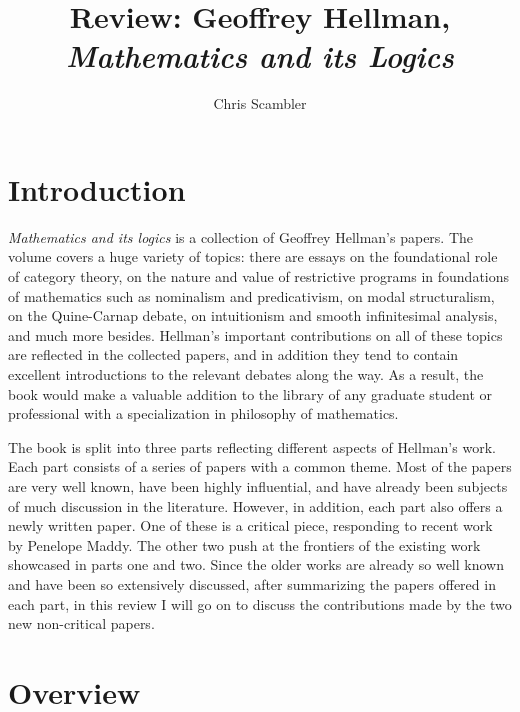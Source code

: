 \documentclass{amsart}
\title{Review: Geoffrey Hellman, \emph{Mathematics and its Logics}}
\author{Chris Scambler}
\theoremstyle{definition}
\begin{document}
 
\maketitle

\section{Introduction}

\emph{Mathematics and its logics} is a collection of Geoffrey Hellman's papers. 
The volume covers a huge variety of topics:
there are essays on the foundational role of category theory, 
on the nature and value of restrictive programs in foundations of mathematics such as 
nominalism and predicativism, 
on modal structuralism, on the Quine-Carnap debate, 
on intuitionism and smooth infinitesimal analysis, 
and much more besides. 
Hellman's important contributions on all of these topics are reflected in the collected papers, 
and in addition they tend to contain excellent introductions to the relevant debates along the way.
As a result, 
the book would make a valuable addition to the library of any graduate student or professional 
with a specialization in philosophy of mathematics. 

The book is split into three parts reflecting different aspects of Hellman's work. 
Each part consists of a series of papers with a common theme.
Most of the papers are very well known, have been highly influential, 
and have already been subjects of much discussion in the literature.
However, in addition, 
each part also offers a newly written paper.
One of these is a critical piece, responding to recent work by Penelope Maddy. 
The other two push at the frontiers of the existing work showcased in parts one and two.
Since the older works are already so well known and have been so extensively discussed, 
after summarizing the papers offered in each part, 
in this review I will go on to discuss the contributions made by the two new non-critical papers.

\section{Overview}
\end{document}
